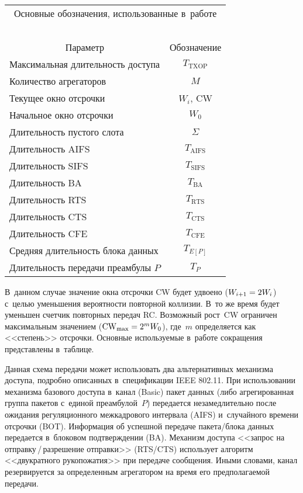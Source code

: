 \begin{multicols}{2}
{\begin{center}
\begin{tabular}{|l|c|}
\multicolumn{2}{c}{Основные обозначения, использованные в~работе}\\
\multicolumn{2}{c}{\ }\\[-4pt]
\hline
\multicolumn{1}{|c|}{Параметр}&Обозначение\\
\hline
Максимальная длительность доступа&$T_{\mathrm{TXOP}}$\\
Количество агрегаторов&$M$\\
Текущее окно отсрочки&$W_i$, CW\\
Начальное окно отсрочки&$W_0$\\
Длительность пустого слота&$\Sigma$\\
Длительность AIFS&$T_{\mathrm{AIFS}}$\\
Длительность SIFS&$T_{\mathrm{SIFS}}$\\
Длительность BA&$T_{\mathrm{BA}}$\\
Длительность RTS&$T_{\mathrm{RTS}}$\\
Длительность CTS&$T_{\mathrm{CTS}}$\\
Длительность CFE&$T_{\mathrm{CFE}}$\\
Средняя длительность блока данных&$T_{E[P]}$\\
Длительность передачи преамбулы $P$&$T_P$\\
\hline
\end{tabular}
\end{center}}

\vspace*{18pt}

\noindent 
В~данном случае значение окна отсрочки CW будет удвоено 
($W_{i+1}\hm= 2W_i$) с~целью уменьшения вероятности повторной 
коллизии. В~то же время будет уменьшен счетчик повторных передач 
RC. Возможный рост~CW ограничен максимальным значением 
($\mathrm{CW}_{\max}\hm= 2^mW_0$), где~$m$ определяется как <<степень>> 
отсрочки. Основные используемые в~работе сокращения представлены 
в~таблице.
    

    
    Данная схема передачи может использовать два альтернативных 
механизма доступа, подробно описанных в~спецификации IEEE 802.11. 
При использовании механизма базового доступа в~канал (Basic) пакет 
данных (либо агрегированная группа пакетов с~единой преамбулой~$P$) 
передается незамедлительно после ожидания регуляционного 
межкадрового интервала (AIFS) и~случайного времени отсрочки 
(BOT). Информация об успешной передаче пакета/блока данных 
передается в~блоковом под\-тверж\-де\-нии (BA). Механизм доступа 
<<запрос на от\-прав\-ку\,/\,раз\-ре\-ше\-ние отправки>> (RTS/CTS) 
использует алгоритм <<двукратного рукопожатия>> при передаче 
сообщения. Иными словами, канал резервируется за определенным 
агрегатором на время его предполагаемой передачи.
    

\end{multicols}

